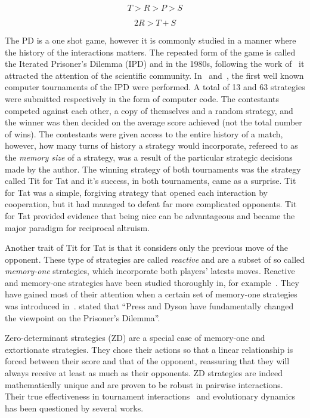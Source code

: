 \documentclass[10pt]{article}
\begin{document}
\begin{equation}\label{eq:pd_constrain_one}
    T > R > P > S
\end{equation}

\begin{equation}\label{eq:pd_constrain_two}
    2R > T + S
\end{equation}

The PD is a one shot game, however it is commonly studied in a manner where the
history of the interactions matters. The repeated form of the game is called the
Iterated Prisoner's Dilemma (IPD) and in the 1980s, following the work
of~\cite{Axelrod1980a, Axelrod1980b} it attracted the attention of the
scientific community. In~\cite{Axelrod1980a} and~\cite{Axelrod1980b}, the first
well known computer tournaments of the IPD were performed. A total of 13 and 63
strategies were submitted respectively in the form of computer code. The
contestants competed against each other, a copy of themselves and a random
strategy, and the winner was then decided on the average score achieved (not the
total number of wins). The contestants were given access to the entire history
of a match, however, how many turns of history a strategy would incorporate,
refereed to as the \textit{memory size} of a strategy, was a result of the
particular strategic decisions made by the author. The winning strategy of both
tournaments was the strategy called Tit for Tat and it's success, in both
tournaments, came as a surprise. Tit for Tat was a simple, forgiving strategy
that opened each interaction by cooperation, but it had managed to defeat far
more complicated opponents. Tit for Tat provided evidence that being nice can be
advantageous and became the major paradigm for reciprocal altruism.

Another trait of Tit for Tat is that it considers only the previous move of the
opponent. These type of strategies are called \textit{reactive} \cite{Nowak1989}
and are a subset of so called \textit{memory-one} strategies, which incorporate
both players' latests moves. Reactive and memory-one strategies have been
studied thoroughly in, for example~\cite{Nowak1990, Nowak1993}. They have gained
most of their attention when a certain set of memory-one strategies was
introduced in~\cite{Press2012}. \cite{Stewart2012} stated that ``Press and Dyson
have fundamentally changed the viewpoint on the Prisoner's Dilemma''.

Zero-determinant strategies (ZD) are a special case of memory-one and
extortionate strategies. They chose their actions so that a linear relationship
is forced between their score and that of the opponent, reassuring that they
will always receive at least as much as their opponents. ZD strategies are indeed
mathematically unique and are proven to be robust in pairwise interactions.
Their true effectiveness in tournament interactions~\cite{Harper2015}
and evolutionary dynamics~\cite{Adami2013, Knight2018} has been questioned by
several works.
\end{document}
